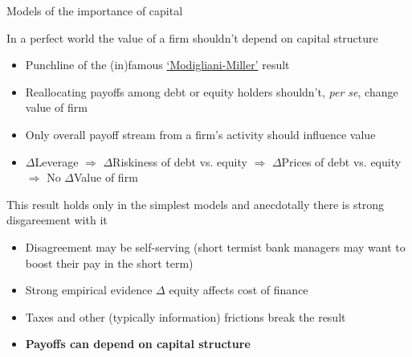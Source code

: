 \begin{frame}{Models of the importance of capital}

In a perfect world the value of a firm shouldn't depend on capital structure
	\begin{itemize}
	\item	Punchline of the (in)famous \href{https://en.wikipedia.org/wiki/Modigliani\%E2\%80\%93Miller_theorem}{`Modigliani-Miller'} result
	\item	Reallocating payoffs among debt or equity holders shouldn't, \emph{per se}, change value of firm
	\item	Only overall payoff stream from a firm's activity should influence value
	\item	$\Delta$Leverage $\Rightarrow$ $\Delta$Riskiness of debt vs. equity $\Rightarrow$ $\Delta$Prices of debt vs. equity $\Rightarrow$ No $\Delta$Value of firm
	\end{itemize}
\vspace{2mm}
This result holds only in the simplest models and anecdotally there is strong disgareement with it
	\begin{itemize}
	\item	Disagreement may be self-serving (short termist bank managers may want to boost their pay in the short term)
	\item	Strong empirical evidence $\Delta$ equity affects cost of finance	
	\item	Taxes and other (typically information) frictions break the result
	\item	\textbf{Payoffs can depend on capital structure}
	\end{itemize}
	
\end{frame}



